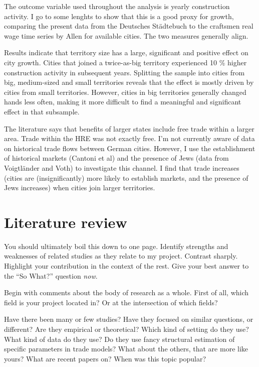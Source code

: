 \documentclass{article}
\begin{document}
The outcome variable used throughout the analysis is yearly construction activity. I go to some lenghts to show that this is a good proxy for growth, comparing the present data from the Deutsches St\"adtebuch to the craftsmen real wage time series by Allen for available cities. The two measures generally align.

Results indicate that territory size has a large, significant and positive effect on city growth. Cities that joined a twice-as-big territory experienced 10 \% higher construction activity in subsequent years. Splitting the sample into cities from big, medium-sized and small territories reveals that the effect is mostly driven by cities from small territories. However, cities in big territories generally changed hands less often, making it more difficult to find a meaningful and significant effect in that subsample.

The literature says that benefits of larger states include free trade within a larger area. Trade within the HRE was not exactly free. I'm not currently aware of data on historical trade flows between German cities. However, I use the establishment of historical markets (Cantoni et al) and the presence of Jews (data from Voigtl\"ander and Voth) to investigate this channel. I find that trade increases (cities are (insignificantly) more likely to establish markets, and the presence of Jews increases) when cities join larger territories.


\section{Literature review}

You should ultimately boil this down to one page. Identify strengths and weaknesses of related studies as they relate to my project. Contrast sharply. Highlight your contribution in the context of the rest. Give your best answer to the ``So What?'' question \textit{now}.

Begin with comments about the body of research as a whole. 
First of all, which field is your project located in? Or at the intersection of which fields?

Have there been many or few studies? Have they focused on similar questions, or different? Are they empirical or theoretical? Which kind of setting do they use? What kind of data do they use? Do they use fancy structural estimation of specific parameters in trade models? What about the others, that are more like yours? What are recent papers on? When was this topic popular?
\end{document}
